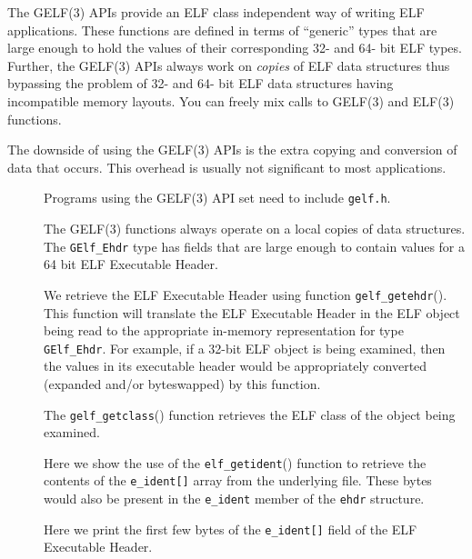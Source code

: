 \documentclass[a4paper]{report}
\makeatletter
\newcommand{\function}[1]{\texttt{#1}()}
\newcommand{\filename}[1]{\texttt{#1}}
\newcommand{\parameter}[1]{\texttt{#1}}
\newcommand{\type}[1]{\texttt{#1}}
\newenvironment{callout}[2][blue]{%
  \begingroup\newcommand{\@cocolor}{#1}%
  \newcommand{\@cogroup}[1]{#2}}{\endgroup}
\newcommand{\@co}[1]{\framebox{\textbf{\color{\@cocolor}#1}}}
\newcommand{\coref}[1]{%
  \hypertarget{\@cogroup.#1.cr}{%
    \hyperlink{\@cogroup.#1.co}{\@co{#1}}}}
\makeatother
\begin{document}
The GELF(3) APIs provide an ELF class independent way of writing ELF
applications.  These functions are defined in terms of ``generic''
types that are large enough to hold the values of their corresponding
32- and 64- bit ELF types.  Further, the GELF(3) APIs always work on
\emph{copies} of ELF data structures thus bypassing the
problem of 32- and 64- bit ELF data structures having incompatible
memory layouts.  You can freely mix calls to GELF(3) and ELF(3)
functions.

The downside of using the GELF(3) APIs is the extra copying and
conversion of data that occurs.  This overhead is usually not
significant to most applications.

\begin{callout}{prog2}
  

  \begin{description}
  \item[\coref{1}] Programs using the GELF(3) API set need to include
    \filename{gelf.h}.

  \item[\coref{2}] The GELF(3) functions always operate on a local
    copies of data structures.  The \type{GElf\_Ehdr} type has fields
    that are large enough to contain values for a 64 bit ELF
    Executable Header.

  \item[\coref{3}] We retrieve the ELF Executable Header using
    function \function{gelf\_getehdr}.  This function will translate
    the ELF Executable Header in the ELF object being read to the
    appropriate in-memory representation for type \type{GElf\_Ehdr}.
    For example, if a 32-bit ELF object is being examined, then the
    values in its executable header would be appropriately converted
    (expanded and/or byteswapped) by this function.

  \item[\coref{4}] The \function{gelf\_getclass} function retrieves
    the ELF class of the object being examined.

  \item[\coref{5}] Here we show the use of the
    \function{elf\_getident} function to retrieve the contents of the
    \parameter{e\_ident[]} array from the underlying file.  These
    bytes would also be present in the \parameter{e\_ident} member of
    the \parameter{ehdr} structure.

    Here we print the first few bytes of the \parameter{e\_ident[]}
    field of the ELF Executable Header.


\end{description}
\end{callout}
\end{document}
